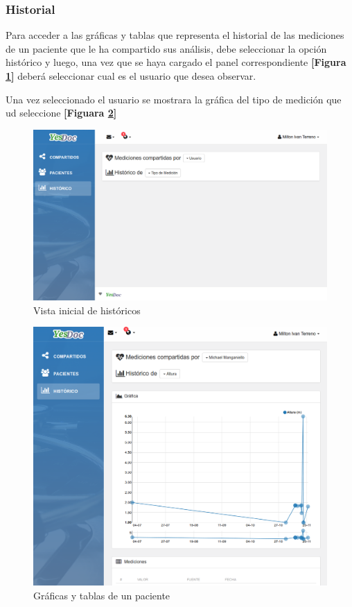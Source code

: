 \subsubsection{Historial}
Para acceder a las gráficas y tablas que representa el historial de las mediciones de un paciente que le ha compartido sus análisis, debe seleccionar la opción histórico y luego, una vez que se haya cargado el panel correspondiente \textbf{[Figura \ref{historico_medico1}]} deberá seleccionar cual es el  usuario que desea observar. 

Una vez seleccionado el usuario se mostrara la gráfica del tipo de medición que ud seleccione \textbf{[Figuara \ref{historico_medico}]}
	\begin{figure}
		\centering
		\includegraphics[width=.8\textwidth]{img/manual_de_usuario/historico_medico1}
		\caption{Vista inicial de históricos}
		\label{historico_medico1}
	\end{figure}
	

	\begin{figure}
		\centering
		\includegraphics[width=.8\textwidth]{img/manual_de_usuario/historico_medico}
		\caption{Gráficas y tablas de un paciente}
		\label{historico_medico}
	\end{figure}



\stopcontents


